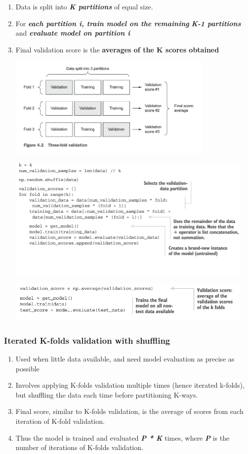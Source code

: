 \documentclass[12pt, a4paper]{article}
\begin{document}
\begin{enumerate}
   \item Data is split into \textbf{\textit{K partitions}} of equal size.
   \item For \textbf{\textit{each partition i, train model on the remaining}}
   \textbf{\textit{K-1 partitions}} and \textbf{\textit{evaluate model on partition i}}
   \item Final validation score is the \textbf{averages of the K scores obtained}
   
   {
      \centering
      \includegraphics[width=10cm]{k_folds_validation_scheme.png}

      \includegraphics[width=12cm]{k_folds_validation_snip1.png}

      \includegraphics[width=12cm]{k_folds_validation_snip2.png}

   }
\end{enumerate}

\newpage
\subsubsection{Iterated K-folds validation with shuffling}
\begin{enumerate}
   \item Used when little data available, and need model evaluation as precise as possible 
   \item Involves applying K-folds validation multiple times (hence iterated k-folds),
   but shuffling the data each time before partitioning K-ways.
   \item Final score, similar to K-folds validation, is the average of scores from each iteration of 
   K-fold validation.
   \item Thus the model is trained and evaluated \textbf{\textit{P * K}} times,
   where \textbf{\textit{P}} is the number of iterations of K-folds validation.
\end{enumerate}
\end{document}
